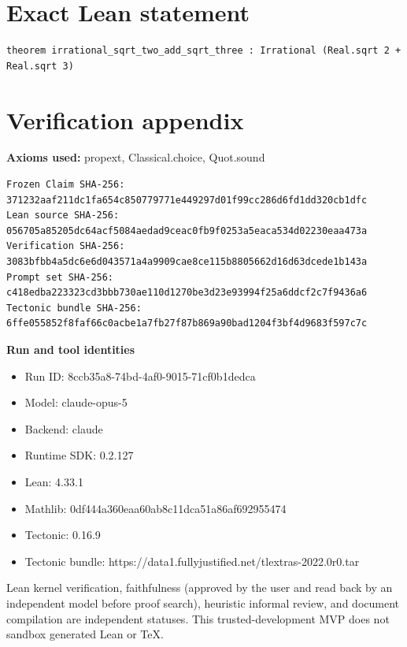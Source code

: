 \documentclass[11pt]{article}
\begin{document}
\section*{Exact Lean statement}
\begin{Verbatim}[fontsize=\small]
theorem irrational_sqrt_two_add_sqrt_three : Irrational (Real.sqrt 2 + Real.sqrt 3)
\end{Verbatim}

\section*{Verification appendix}
\textbf{Axioms used:} propext, Classical.choice, Quot.sound

\begin{Verbatim}[fontsize=\small]
Frozen Claim SHA-256: 371232aaf211dc1fa654c850779771e449297d01f99cc286d6fd1dd320cb1dfc
Lean source SHA-256: 056705a85205dc64acf5084aedad9ceac0fb9f0253a5eaca534d02230eaa473a
Verification SHA-256: 3083bfbb4a5dc6e6d043571a4a9909cae8ce115b8805662d16d63dcede1b143a
Prompt set SHA-256: c418edba223323cd3bbb730ae110d1270be3d23e93994f25a6ddcf2c7f9436a6
Tectonic bundle SHA-256: 6ffe055852f8faf66c0acbe1a7fb27f87b869a90bad1204f3bf4d9683f597c7c
\end{Verbatim}

\begin{samepage}
\textbf{Run and tool identities}
\begin{itemize}
\item Run ID: 8ccb35a8-74bd-4af0-9015-71cf0b1dedca
\item Model: claude-opus-5
\item Backend: claude
\item Runtime SDK: 0.2.127
\item Lean: 4.33.1
\item Mathlib: 0df444a360eaa60ab8c11dca51a86af692955474
\item Tectonic: 0.16.9
\item Tectonic bundle: https://data1.fullyjustified.net/tlextras-2022.0r0.tar
\end{itemize}
\end{samepage}

\vfill
\small
Lean kernel verification, faithfulness (approved by the user and read back by an
independent model before proof search), heuristic informal review, and document
compilation are independent statuses. This trusted-development MVP
does not sandbox generated Lean or TeX.
\end{document}
